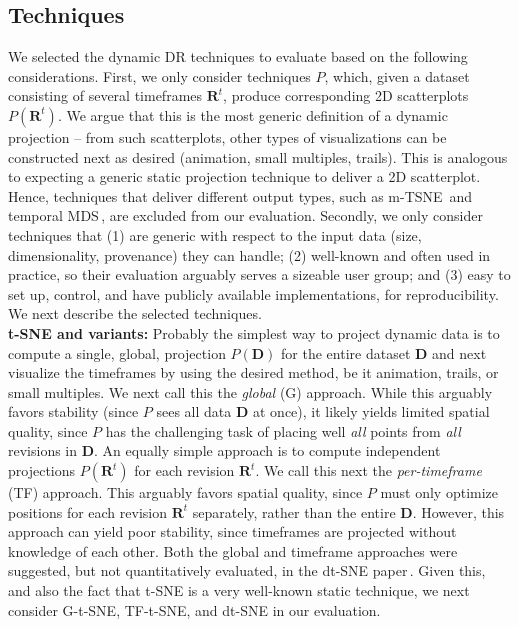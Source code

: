 \subsection{Techniques}
\label{subsec:techniques}
%
We selected the dynamic DR techniques to evaluate based on the following considerations. First, we only consider techniques $P$, which, given a dataset consisting of several timeframes $\mathbf{R}^t$, produce corresponding 2D scatterplots $P(\mathbf{R}^t)$. We argue that this is the most generic definition of a dynamic projection -- from such scatterplots, other types of visualizations can be constructed next as desired (animation, small multiples, trails). This is analogous to expecting a generic static projection technique to deliver a 2D scatterplot. Hence, techniques that deliver different output types, such as m-TSNE\,\citep{Nguyen2017} and temporal MDS\,\citep{Jackle2016}, are excluded from our evaluation. Secondly, we only consider techniques that (1) are generic with respect to the input data (size, dimensionality, provenance) they can handle; (2) well-known and often used in practice, so their evaluation arguably serves a sizeable user group; and (3) easy to set up, control, and have publicly available implementations, for reproducibility. We next describe the selected techniques.\\



\noindent\textbf{t-SNE and variants:} Probably the simplest way to project dynamic data is to compute a single, global, projection $P(\mathbf{D})$ for the entire dataset $\mathbf{D}$ and next visualize the timeframes by using the desired method, be it animation, trails, or small multiples. We next call this the \emph{global} (G) approach. While this arguably favors stability (since $P$ sees all data $\mathbf{D}$ at once), it likely yields limited spatial quality, since $P$ has the challenging task of placing well \emph{all} points from \emph{all} revisions in $\mathbf{D}$. An equally simple approach is to compute independent projections $P(\mathbf{R}^t)$ for each revision $\textbf{R}^t$. We call this next the \emph{per-timeframe} (TF) approach. This arguably favors spatial quality, since $P$ must only optimize positions for each revision $\mathbf{R}^t$ separately, rather than the entire $\mathbf{D}$. However, this approach can yield poor stability, since timeframes are projected without knowledge of each other. Both the global and timeframe approaches were suggested, but not quantitatively evaluated, in the dt-SNE paper\,\citep{Rauber2016}. Given this, and also the fact that t-SNE is a very well-known static technique, we next consider G-t-SNE, TF-t-SNE, and dt-SNE in our evaluation.\\

